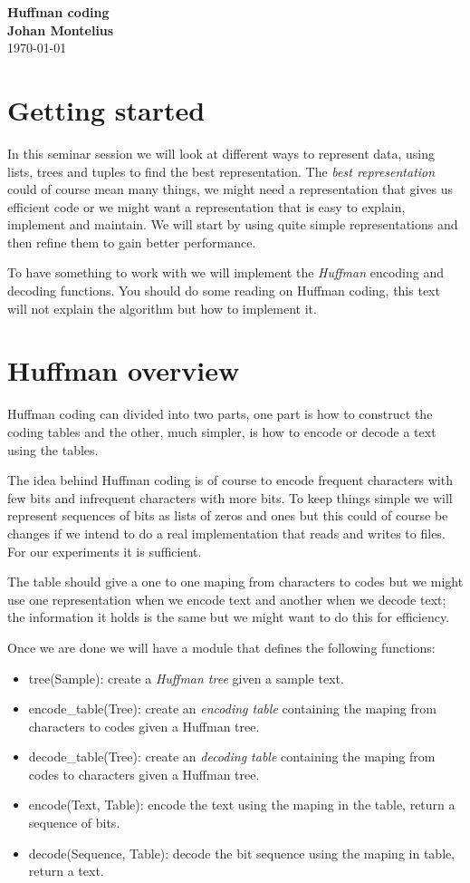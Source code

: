 \documentclass[a4paper,11pt]{article}
\newcommand{\nnsection}[1]{
\section*{#1}
\addcontentsline{toc}{section}{#1}
}
\begin{document}
\begin{center}
\vspace{20pt}
\textbf{\large Huffman coding}\\
\vspace{10pt}
\textbf{Johan Montelius}\\
\vspace{10pt}
\today{}
\end{center}


\nnsection{Getting started}

In this seminar session we will look at different ways to represent
data, using lists, trees and tuples to find the best
representation. The {\em best representation} could of course mean
many things, we might need a representation that gives us efficient
code or we might want a representation that is easy to explain,
implement and maintain. We will start by using quite simple
representations and then refine them to gain better performance.

To have something to work with we will implement the {\em Huffman}
encoding and decoding functions. You should do some reading on Huffman
coding, this text will not explain the algorithm but how to implement it.

\section{Huffman overview}

Huffman coding can divided into two parts, one part is how to
construct the coding tables and the other, much simpler, is how to
encode or decode a text using the tables. 

The idea behind Huffman coding is of course to encode frequent
characters with few bits and infrequent characters with more bits. To
keep things simple we will represent sequences of bits as lists of
zeros and ones but this could of course be changes if we intend to do a
real implementation that reads and writes to files. For our
experiments it is sufficient.

The table should give a one to one maping from characters to codes but
we might use one representation when we encode text and another when
we decode text; the information it holds is the same but we might want
to do this for efficiency.

Once we are done we will have a module that defines the following functions:

\begin{itemize}
\item {tree(Sample):} create a {\em Huffman tree} given a sample text.
\item {encode\_table(Tree):} create an {\em encoding table} containing the maping from characters to codes given a Huffman tree.
\item {decode\_table(Tree):} create an {\em decoding table} containing the maping from codes to characters given a Huffman tree.
\item {encode(Text, Table):} encode the text using the maping in the table, return a sequence of bits.
\item {decode(Sequence, Table):} decode the bit sequence using the maping in table, return a text.
\end{itemize}
\end{document}
